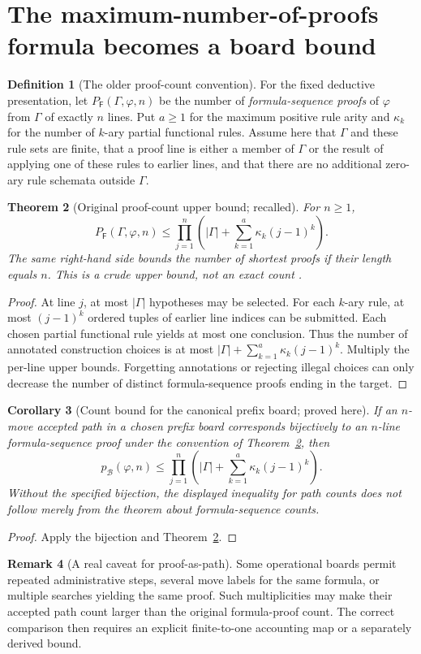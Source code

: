 \documentclass[11pt,letterpaper]{article}
\newtheorem{theorem}{Theorem}[section]
\newtheorem{corollary}[theorem]{Corollary}
\theoremstyle{definition}
\newtheorem{definition}[theorem]{Definition}
\newtheorem{remark}[theorem]{Remark}
\newcommand{\B}{\mathcal B}
\newcommand{\F}{\mathsf F}
\begin{document}
\section{The maximum-number-of-proofs formula becomes a board bound}
\begin{definition}[The older proof-count convention]
For the fixed deductive presentation, let $P_\F(\Gamma,\varphi,n)$ be the number of \emph{formula-sequence proofs} of $\varphi$ from $\Gamma$ of exactly $n$ lines. Put $a\ge1$ for the maximum positive rule arity and $\kappa_k$ for the number of $k$-ary partial functional rules. Assume here that $\Gamma$ and these rule sets are finite, that a proof line is either a member of $\Gamma$ or the result of applying one of these rules to earlier lines, and that there are no additional zero-ary rule schemata outside $\Gamma$.
\end{definition}
\begin{theorem}[Original proof-count upper bound; recalled]\label{thm:oldbound}
For $n\ge1$,
\[
\boxed{P_\F(\Gamma,\varphi,n)\le
\prod_{j=1}^{n}\left(|\Gamma|+\sum_{k=1}^{a}\kappa_k(j-1)^k\right).}
\]
The same right-hand side bounds the number of shortest proofs if their length equals $n$. This is a crude upper bound, not an exact count \cite{depths}.
\end{theorem}
\begin{proof}
At line $j$, at most $|\Gamma|$ hypotheses may be selected. For each $k$-ary rule, at most $(j-1)^k$ ordered tuples of earlier line indices can be submitted. Each chosen partial functional rule yields at most one conclusion. Thus the number of annotated construction choices is at most $|\Gamma|+\sum_{k=1}^a\kappa_k(j-1)^k$. Multiply the per-line upper bounds. Forgetting annotations or rejecting illegal choices can only decrease the number of distinct formula-sequence proofs ending in the target.
\end{proof}
\begin{corollary}[Count bound for the canonical prefix board; proved here]\label{cor:boardbound}
If an $n$-move accepted path in a chosen prefix board corresponds bijectively to an $n$-line formula-sequence proof under the convention of Theorem~\ref{thm:oldbound}, then
\[
p_\B(\varphi,n)\le\prod_{j=1}^{n}\left(|\Gamma|+\sum_{k=1}^{a}\kappa_k(j-1)^k\right).
\]
Without the specified bijection, the displayed inequality for \emph{path counts} does not follow merely from the theorem about formula-sequence counts.
\end{corollary}
\begin{proof}Apply the bijection and Theorem~\ref{thm:oldbound}.\end{proof}
\begin{remark}[A real caveat for proof-as-path]
Some operational boards permit repeated administrative steps, several move labels for the same formula, or multiple searches yielding the same proof. Such multiplicities may make their accepted path count larger than the original formula-proof count. The correct comparison then requires an explicit finite-to-one accounting map or a separately derived bound.
\end{remark}
\end{document}
